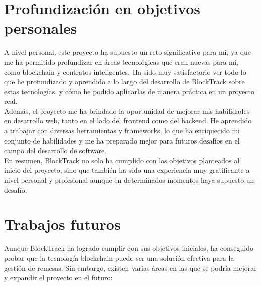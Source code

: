 \section{Profundización en objetivos personales}
A nivel personal, este proyecto ha supuesto un reto significativo para mí, ya que me ha permitido
profundizar en áreas tecnológicas que eran nuevas para mí, como blockchain y contratos inteligentes. Ha sido
muy satisfactorio ver todo lo que he profundizado y aprendido a lo largo del desarrollo de BlockTrack sobre estas
tecnologías, y cómo he podido aplicarlas de manera práctica en un proyecto real. \\

Además, el proyecto me ha brindado la oportunidad de mejorar mis habilidades en desarrollo web, tanto en el lado
del frontend como del backend. He aprendido a trabajar con diversas herramientas y frameworks, lo que ha enriquecido
mi conjunto de habilidades y me ha preparado mejor para futuros desafíos en el campo del desarrollo de software. \\

En resumen, BlockTrack no solo ha cumplido con los objetivos planteados al inicio del proyecto, sino que también
ha sido una experiencia muy gratificante a nivel personal y profesional aunque en determinados momentos haya
supuesto un desafío.

\section{Trabajos futuros}
Aunque BlockTrack ha logrado cumplir con sus objetivos iniciales, ha conseguido probar que la tecnología blockchain
puede ser una solución efectiva para la gestión de remesas. Sin embargo, existen varias áreas en las que se podría
mejorar y expandir el proyecto en el futuro:

